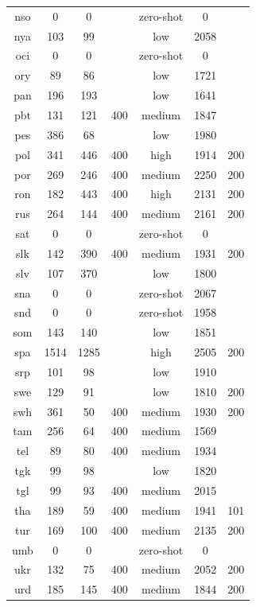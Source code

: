 \begin{table}[!htb]
\begin{minipage}[t]{0.45\textwidth}
\begin{tabular}{@{}ccccccc@{}}
        nso & 0 & 0 &  & zero-shot & 0 &  \\
        nya & 103 & 99 &  & low & 2058 &  \\
        oci & 0 & 0 &  & zero-shot & 0 &  \\
        ory & 89 & 86 &  & low & 1721 &  \\
        pan & 196 & 193 &  & low & 1641 &  \\
        pbt & 131 & 121 & 400 & medium & 1847 &  \\
        pes & 386 & 68 &  & low & 1980 &  \\
        pol & 341 & 446 & 400 & high & 1914 & 200 \\
        por & 269 & 246 & 400 & medium & 2250 & 200 \\
        ron & 182 & 443 & 400 & high & 2131 & 200 \\
        rus & 264 & 144 & 400 & medium & 2161 & 200 \\
        sat & 0 & 0 &  & zero-shot & 0 &  \\
        slk & 142 & 390 & 400 & medium & 1931 & 200 \\
        slv & 107 & 370 &  & low & 1800 &  \\
        sna & 0 & 0 &  & zero-shot & 2067 &  \\
        snd & 0 & 0 &  & zero-shot & 1958 &  \\
        som & 143 & 140 &  & low & 1851 &  \\
        spa & 1514 & 1285 &  & high & 2505 & 200 \\
        srp & 101 & 98 &  & low & 1910 &  \\
        swe & 129 & 91 &  & low & 1810 & 200 \\
        swh & 361 & 50 & 400 & medium & 1930 & 200 \\
        tam & 256 & 64 & 400 & medium & 1569 &  \\
        tel & 89 & 80 & 400 & medium & 1934 &  \\
        tgk & 99 & 98 &  & low & 1820 &  \\
        tgl & 99 & 93 & 400 & medium & 2015 &  \\
        tha & 189 & 59 & 400 & medium & 1941 & 101 \\
        tur & 169 & 100 & 400 & medium & 2135 & 200 \\
        umb & 0 & 0 &  & zero-shot & 0 &  \\
        ukr & 132 & 75 & 400 & medium & 2052 & 200 \\
        urd & 185 & 145 & 400 & medium & 1844 & 200 \\

\end{tabular}
\end{minipage}
\end{table}

